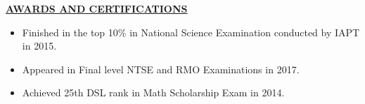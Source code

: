 \documentclass{article}
\begin{document}
\noindent \textbf{\underline{AWARDS AND CERTIFICATIONS}} 
\begin{itemize}[noitemsep,nolistsep,leftmargin=*]
\item {\small Finished in the top 10\% in National Science Examination conducted by IAPT in 2015.}
\item {\small Appeared in Final level NTSE and RMO Examinations in 2017.}
\item {\small Achieved 25th DSL rank in Math Scholarship Exam in 2014.}
\end{itemize}

\end{document}
